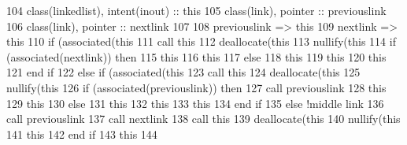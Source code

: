 \begin{DoxyCode}
104     \textcolor{keywordtype}{class}(linkedlist), \textcolor{keywordtype}{intent(inout)} :: this    
105     \textcolor{keywordtype}{class}(link), \textcolor{keywordtype}{pointer} :: previouslink
106     \textcolor{keywordtype}{class}(link), \textcolor{keywordtype}{pointer} :: nextlink 
107     
108     previouslink => this%
109     nextlink => this%
110     \textcolor{keywordflow}{if} (\textcolor{keyword}{associated}(this%
111         \textcolor{keyword}{call }this%
112         \textcolor{keyword}{deallocate}(this%
113         \textcolor{keyword}{nullify}(this%
114         \textcolor{keywordflow}{if} (\textcolor{keyword}{associated}(nextlink)) \textcolor{keywordflow}{then}
115             this%
116             this%
117         \textcolor{keywordflow}{else}
118             this%
119             this%
120             this%
121 \textcolor{keywordflow}{        end if}
122     \textcolor{keywordflow}{else} \textcolor{keywordflow}{if} (\textcolor{keyword}{associated}(this%
123         \textcolor{keyword}{call }this%
124         \textcolor{keyword}{deallocate}(this%
125         \textcolor{keyword}{nullify}(this%
126         \textcolor{keywordflow}{if} (\textcolor{keyword}{associated}(previouslink)) \textcolor{keywordflow}{then}
127             \textcolor{keyword}{call }previouslink%
128             this%
129             this%
130         \textcolor{keywordflow}{else}
131             this%
132             this%
133             this%
134 \textcolor{keywordflow}{        end if}
135     \textcolor{keywordflow}{else} \textcolor{comment}{!middle link}
136         \textcolor{keyword}{call }previouslink%
137         \textcolor{keyword}{call }nextlink%
138         \textcolor{keyword}{call }this%
139         \textcolor{keyword}{deallocate}(this%
140         \textcolor{keyword}{nullify}(this%
141         this%
142 \textcolor{keywordflow}{    end if}
143     this%
144     
\end{DoxyCode}
\mbox{\label{namespaceabstract__linkedlist__mod_a46ff8b8a3ab81610eb47d72d742778c3}} 

